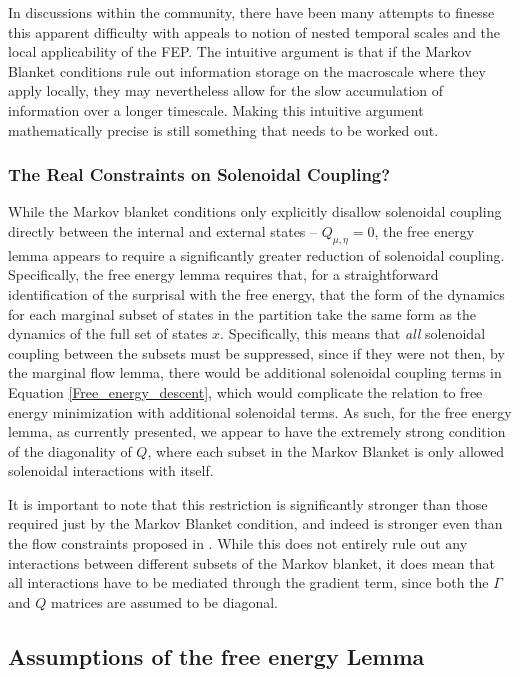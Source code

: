 In discussions within the community, there have been many attempts to finesse this apparent difficulty with appeals to notion of nested temporal scales and the local applicability of the FEP. The intuitive argument is that if the Markov Blanket conditions rule out information storage on the macroscale where they apply locally, they may nevertheless allow for the slow accumulation of information over a longer timescale. Making this intuitive argument mathematically precise is still something that needs to be worked out.


\subsubsection{The Real Constraints on Solenoidal Coupling?}

While the Markov blanket conditions only explicitly disallow solenoidal coupling directly between the internal and external states -- $Q_{\mu,\eta} = 0$, the free energy lemma appears to require a significantly greater reduction of solenoidal coupling. Specifically, the free energy lemma requires that, for a straightforward identification of the surprisal with the free energy, that the form of the dynamics for each marginal subset of states in the partition take the same form as the dynamics of the full set of states $x$. Specifically, this means that \emph{all} solenoidal coupling between the subsets must be suppressed, since if they were not then, by the marginal flow lemma, there would be additional solenoidal coupling terms in Equation \ref{Free_energy_descent}, which would complicate the relation to free energy minimization with additional solenoidal terms. As such, for the free energy lemma, as currently presented, we appear to have the extremely strong condition of the diagonality of $Q$, where each subset in the Markov Blanket is only allowed solenoidal interactions with itself.

It is important to note that this restriction is significantly stronger than those required just by the Markov Blanket condition, and indeed is stronger even than the flow constraints proposed in \citet{friston2020some}. While this does not entirely rule out any interactions between different subsets of the Markov blanket, it does mean that all interactions have to be mediated through the gradient term, since both the $\Gamma$ and $Q$ matrices are assumed to be diagonal.

\subsection{Assumptions of the free energy Lemma}
